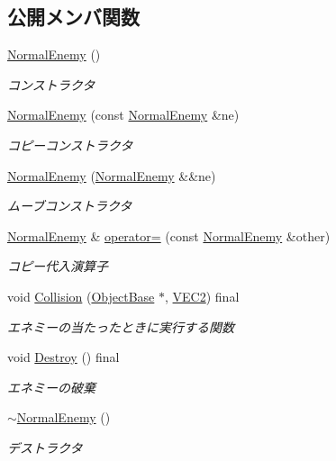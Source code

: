 \subsection*{公開メンバ関数}
\begin{DoxyCompactItemize}
\item 
\mbox{\hyperlink{class_normal_enemy_aa386eea59a2983574fe7d55a91f93012}{Normal\+Enemy}} ()
\begin{DoxyCompactList}\small\item\em コンストラクタ \end{DoxyCompactList}\item 
\mbox{\hyperlink{class_normal_enemy_a08bfcea97297d0cff5c10854c8f5ffb8}{Normal\+Enemy}} (const \mbox{\hyperlink{class_normal_enemy}{Normal\+Enemy}} \&ne)
\begin{DoxyCompactList}\small\item\em コピーコンストラクタ \end{DoxyCompactList}\item 
\mbox{\hyperlink{class_normal_enemy_a7c024e471aa0f2ae094aa399dc2e0dcf}{Normal\+Enemy}} (\mbox{\hyperlink{class_normal_enemy}{Normal\+Enemy}} \&\&ne)
\begin{DoxyCompactList}\small\item\em ムーブコンストラクタ \end{DoxyCompactList}\item 
\mbox{\hyperlink{class_normal_enemy}{Normal\+Enemy}} \& \mbox{\hyperlink{class_normal_enemy_a4294020d85d9ae77a47294e04fd048b6}{operator=}} (const \mbox{\hyperlink{class_normal_enemy}{Normal\+Enemy}} \&other)
\begin{DoxyCompactList}\small\item\em コピー代入演算子 \end{DoxyCompactList}\item 
void \mbox{\hyperlink{class_normal_enemy_ac27e00973d2430da57e044bfe04fe5b4}{Collision}} (\mbox{\hyperlink{class_object_base}{Object\+Base}} $\ast$, \mbox{\hyperlink{common_8h_afb0c5e21d4133ff4f200992c0b534e1b}{V\+E\+C2}}) final
\begin{DoxyCompactList}\small\item\em エネミーの当たったときに実行する関数 \end{DoxyCompactList}\item 
void \mbox{\hyperlink{class_normal_enemy_a8a4271b6da6c7679d134d1c08125815b}{Destroy}} () final
\begin{DoxyCompactList}\small\item\em エネミーの破棄 \end{DoxyCompactList}\item 
\mbox{\hyperlink{class_normal_enemy_adc9a3115b2494739261b5cc363c11c32}{$\sim$\+Normal\+Enemy}} ()
\begin{DoxyCompactList}\small\item\em デストラクタ \end{DoxyCompactList}\end{DoxyCompactItemize}
